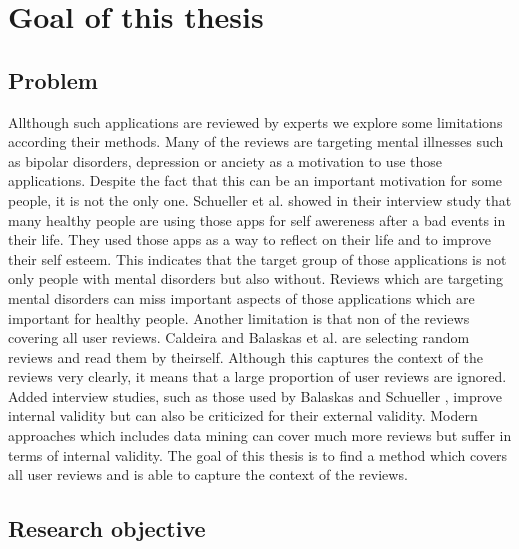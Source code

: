 
\chapter{Goal of this thesis}
\label{ch:goal}
\section{Problem}
\label{sec:problem}

Allthough such applications are reviewed by experts we explore some limitations according their methods.
Many of the reviews are targeting mental illnesses such as bipolar disorders, depression or anciety as a motivation to use those applications.
Despite the fact that this can be an important motivation for some people, it is not the only one.
Schueller et al. \cite{schueller2021UnderstandingPU} showed in their interview study that many healthy people are using those apps for self awereness after a bad events in their life.
They used those apps as a way to reflect on their life and to improve their self esteem.
This indicates that the target group of those applications is not only people with mental disorders but also without.
Reviews which are targeting mental disorders can miss important aspects of those applications which are important for healthy people.
Another limitation is that non of the reviews covering all user reviews.
Caldeira \cite{caldeira_mobile_nodate} and Balaskas et al. \cite{Balaskas2022UnderstandingUP} are selecting random reviews and read them by theirself.
Although this captures the context of the reviews very clearly, it means that a large proportion of user reviews are ignored.
Added interview studies, such as those used by Balaskas \cite{Balaskas2022UnderstandingUP} and Schueller \cite{Balaskas2022UnderstandingUP},
improve internal validity but can also be criticized for their external validity.
Modern approaches which includes data mining can cover much more reviews but suffer in terms of internal validity.
The goal of this thesis is to find a method which covers all user reviews and is able to capture the context of the reviews.

\section{Research objective}
\label{sec:research-objective}

